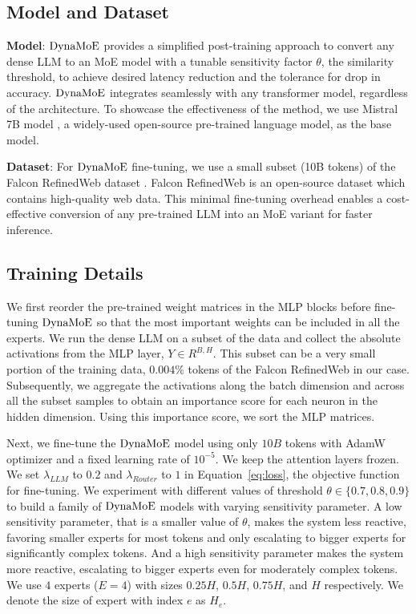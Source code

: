 \subsection{Model and Dataset}
\textbf{Model}: $\operatorname{DynaMoE}$ provides a simplified post-training approach to convert any dense LLM to an MoE model with a tunable sensitivity factor $\theta$, the similarity threshold, to achieve desired latency reduction and the tolerance for drop in accuracy. $\operatorname{DynaMoE}$ integrates seamlessly with any transformer model, regardless of the architecture. To showcase the effectiveness of the method, we use Mistral 7B model \cite{Jiang2023Mistral7}, a widely-used open-source pre-trained language model, as the base model.


\textbf{Dataset}: For $\operatorname{DynaMoE}$ fine-tuning, we use a small subset (10B tokens) of the Falcon RefinedWeb dataset \cite{refinedweb}. Falcon RefinedWeb is an open-source dataset which contains high-quality web data. This minimal fine-tuning overhead enables a cost-effective conversion of any pre-trained LLM into an MoE variant for faster inference.

\subsection{Training Details}
We first reorder the pre-trained weight matrices \cite{Samragh2023WeightSD} in the MLP blocks before fine-tuning $\operatorname{DynaMoE}$ so that the most important weights can be included in all the experts. We run the dense LLM on a subset of the data and collect the absolute activations from the MLP layer, $Y \in R^{B,H}$. This subset can be a very small portion of the training data, $0.004\%$ tokens of the Falcon RefinedWeb in our case. Subsequently, we aggregate the activations along the batch dimension and across all the subset samples to obtain an importance score for each neuron in the hidden dimension. Using this importance score, we sort the MLP matrices.

 Next, we fine-tune the $\operatorname{DynaMoE}$ model using only $10B$ tokens with AdamW optimizer \cite{Loshchilov2017DecoupledWD} and a fixed learning rate of $10^{-5}$. We keep the attention layers frozen. We set $\lambda_{LLM}$ to $0.2$ and $\lambda_{Router}$ to $1$ in Equation~\eqref{eq:loss}, the objective function for fine-tuning. We experiment with different values of threshold $\theta \in {\{0.7, 0.8, 0.9\}}$ to build a family of $\operatorname{DynaMoE}$ models with varying sensitivity parameter. A low sensitivity parameter, that is a smaller value of $\theta$, makes the system less reactive, favoring smaller experts for most tokens and only escalating to bigger experts for significantly complex tokens. And a high sensitivity parameter makes the system more reactive, escalating to bigger experts even for moderately complex tokens. We use $4$ experts ($E=4$) with sizes $0.25H$, $0.5H$, $0.75H$, and $H$ respectively. We denote the size of expert with index $e$ as $H_e$.


 


